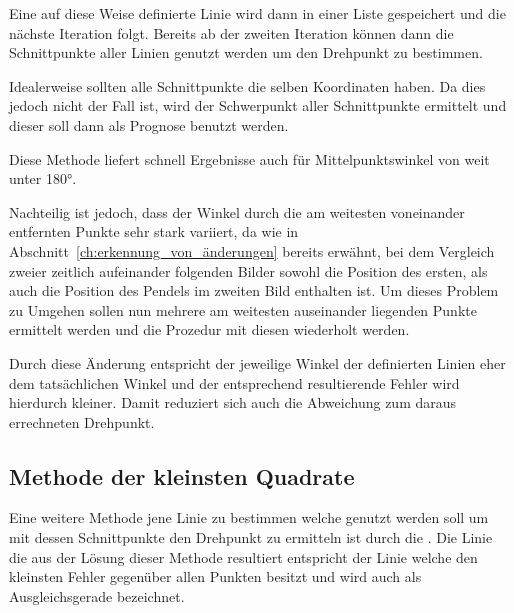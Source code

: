 Eine auf diese Weise definierte Linie wird dann in einer Liste gespeichert und die nächste Iteration folgt.
Bereits ab der zweiten Iteration können dann die Schnittpunkte aller Linien genutzt werden um den Drehpunkt zu bestimmen.


Idealerweise sollten alle Schnittpunkte die selben Koordinaten haben.
Da dies jedoch nicht der Fall ist, wird der Schwerpunkt aller Schnittpunkte ermittelt und dieser soll dann als Prognose benutzt werden.

Diese Methode liefert schnell Ergebnisse auch für Mittelpunktswinkel von weit unter 180°.


Nachteilig ist jedoch, dass der Winkel durch die am weitesten voneinander entfernten Punkte sehr stark variiert, da wie in Abschnitt~\ref{ch:erkennung_von_änderungen} bereits erwähnt, bei dem Vergleich zweier zeitlich aufeinander folgenden Bilder sowohl die Position des ersten, als auch die Position des Pendels im zweiten Bild enthalten ist.
Um dieses Problem zu Umgehen sollen nun mehrere am weitesten auseinander liegenden Punkte ermittelt werden und die Prozedur mit diesen wiederholt werden.

Durch diese Änderung entspricht der jeweilige Winkel der definierten Linien eher dem tatsächlichen Winkel und der entsprechend resultierende Fehler wird hierdurch kleiner.
Damit reduziert sich auch die Abweichung zum daraus errechneten Drehpunkt.

\subsection{Methode der kleinsten Quadrate}

Eine weitere Methode jene Linie zu bestimmen welche genutzt werden soll um mit dessen Schnittpunkte den Drehpunkt zu ermitteln ist durch die .
Die Linie die aus der Lösung dieser Methode resultiert entspricht der Linie welche den kleinsten Fehler gegenüber allen Punkten besitzt und wird auch als Ausgleichsgerade bezeichnet. %


